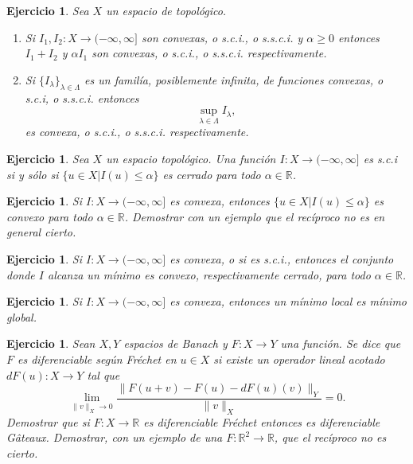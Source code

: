 \documentclass{article}
\newcounter{ejer}
\newtheorem{ejercicio}[ejer]{Ejercicio}}
\newcommand{\rr}{\mathbb{R}}
\begin{document}
\begin{ejercicio} Sea $X$ un espacio de topológico.
\begin{enumerate}
 \item  Si $I_1,I_2:X\to (-\infty,\infty]$ son convexas, o s.c.i., o s.s.c.i. y $\alpha\geq 0$ entonces $I_1+I_2$ y $\alpha I_1$ son convexas, o s.c.i., o s.s.c.i. respectivamente.
 \item Si $\{I_{\lambda}\}_{\lambda\in\Lambda}$ es un familía, posiblemente infinita, de funciones convexas, o s.c.i, o s.s.c.i. entonces
 \[\sup_{\lambda\in\Lambda}I_{\lambda}, \]
es convexa, o s.c.i., o s.s.c.i. respectivamente.

\end{enumerate}

\end{ejercicio}



\begin{ejercicio} Sea $X$ un espacio topológico. Una función $I:X\to (-\infty,\infty]$  es s.c.i si y sólo si $\{u\in X|I(u)\leq \alpha\}$ es cerrado para todo $\alpha\in\rr$.

\end{ejercicio}

\begin{ejercicio} Si $I:X\to (-\infty,\infty]$  es convexa, entonces $\{u\in X|I(u)\leq \alpha\}$ es convexo para todo $\alpha\in\rr$. Demostrar con un ejemplo que el recíproco no es en general cierto.

\end{ejercicio}

\begin{ejercicio}  Si $I:X\to (-\infty,\infty]$  es convexa, o si es  s.c.i.,  entonces el conjunto donde $I$ alcanza un mínimo es convexo, respectivamente cerrado, para todo $\alpha\in\rr$.
 \end{ejercicio}

\begin{ejercicio}   Si $I:X\to (-\infty,\infty]$  es convexa, entonces un mínimo local es mínimo global.

\end{ejercicio}


\begin{ejercicio} Sean $X,Y$ espacios de Banach y $F:X\to Y$ una función. Se dice que $F$ es \emph{diferenciable según Fréchet} en $u\in X$ si existe un operador lineal acotado $dF(u):X\to Y$ tal que
\[\lim_{\|v\|_X\to 0}\frac{\|F(u+v)-F(u)-dF(u)(v)\|_Y}{\|v\|_X}=0.\]
Demostrar que si $F:X\to\rr$ es diferenciable Fréchet entonces es diferenciable G\^ateaux. Demostrar, con un ejemplo de una  $F:\rr^2\to\rr$, que el recíproco no es cierto.
\end{ejercicio}
\end{document}
